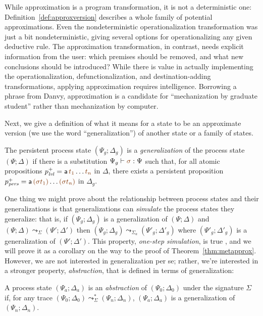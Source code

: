 \noindent
While approximation is a program transformation, it is not a
deterministic one: Definition~\ref{def:approxversion} describes a
whole family of potential approximations. Even the nondeterministic
operationalization transformation was just a bit nondeterministic,
giving several options for operationalizing any given deductive
rule. The approximation transformation, in contrast, needs explicit
information from the user: which premises should be removed, and what
new conclusions should be introduced? While there is value in actually
implementing the operationalization, defunctionalization, and
destination-adding transformations, applying approximation requires
intelligence. Borrowing a phrase from Danvy, approximation is a
candidate for ``mechanization by graduate student'' rather than
mechanization by computer.

Next, we give a definition of what it means for a state to be an 
approximate version (we use the word ``generalization'') of another state
or a family of states. 

\bigskip
\begin{definition}
  The persistent process state $(\Psi_g; \Delta_g)$ is a {\em
    generalization} of the process state $(\Psi; \Delta)$ if there is
  a substitution $\Psi_g \vdash \lf{\sigma} : \Psi$ such that, for all
  atomic propositions $p^+_\mlvl = {\sf a}\,\lf{t_1}\ldots \lf{t_n}$
  in $\Delta$, there exists a persistent proposition
  $p^+_\mpers = {\sf a}\,\lf{(\sigma t_1)}\ldots\lf{(\sigma t_n)}$ in
  $\Delta_g$.
\end{definition}
\bigskip

One thing we might prove about the relationship between process states
and their generalizations is that generalizations can {\it simulate}
the process states they generalize: that is, if $(\Psi_g; \Delta_g)$
is a generalization of $(\Psi; \Delta)$ and $(\Psi; \Delta)
\leadsto_\Sigma (\Psi'; \Delta')$ then $(\Psi_g; \Delta_g)
\leadsto_{\Sigma_a} (\Psi'_g; \Delta'_g)$ where $(\Psi'_g; \Delta'_g)$
is a generalization of $(\Psi'; \Delta')$. This property, 
{\it one-step simulation}, is true
\cite[Lemma~6]{simmons11logical}, and we will
prove it as a corollary on the way to the proof of
Theorem~\ref{thm:metapprox}.  However, we are not interested in
generalization per se; rather, we're interested in a stronger
property, {\em abstraction}, that is defined in terms of
generalization:

\bigskip
\begin{definition}
A process state $(\Psi_a; \Delta_a)$ is an {\em abstraction} of 
$(\Psi_0; \Delta_0)$ under the signature $\Sigma$ if, for any trace
$(\Psi_0; \Delta_0) \leadsto^*_\Sigma (\Psi_n; \Delta_n)$, 
$(\Psi_a; \Delta_a)$ is a generalization of $(\Psi_n; \Delta_n)$. 
\end{definition}
\bigskip

